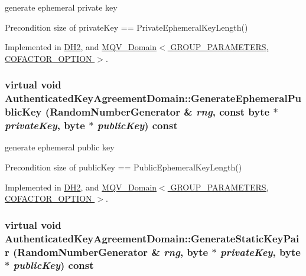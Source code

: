 generate ephemeral private key \begin{DoxyPrecond}{Precondition}
size of privateKey == PrivateEphemeralKeyLength() 
\end{DoxyPrecond}


Implemented in \hyperlink{class_d_h2_ab0e10e700f4461005b386a53ca37e7f8}{DH2}, and \hyperlink{class_m_q_v___domain_aefc317e9012eea4b7f43b3a72398e34d}{MQV\_\-Domain$<$ GROUP\_\-PARAMETERS, COFACTOR\_\-OPTION $>$}.\hypertarget{class_authenticated_key_agreement_domain_a9d1bc83a77f44af6616da42c33b3bc49}{
\subsubsection[{GenerateEphemeralPublicKey}]{\setlength{\rightskip}{0pt plus 5cm}virtual void AuthenticatedKeyAgreementDomain::GenerateEphemeralPublicKey ({\bf RandomNumberGenerator} \& {\em rng}, \/  const byte $\ast$ {\em privateKey}, \/  byte $\ast$ {\em publicKey}) const}}
\label{class_authenticated_key_agreement_domain_a9d1bc83a77f44af6616da42c33b3bc49}


generate ephemeral public key \begin{DoxyPrecond}{Precondition}
size of publicKey == PublicEphemeralKeyLength() 
\end{DoxyPrecond}


Implemented in \hyperlink{class_d_h2_ab8f69e52f50794ca51774f671cfa45da}{DH2}, and \hyperlink{class_m_q_v___domain_a2cc3ee07353b65ac5f353ef5cb7aad14}{MQV\_\-Domain$<$ GROUP\_\-PARAMETERS, COFACTOR\_\-OPTION $>$}.\hypertarget{class_authenticated_key_agreement_domain_a164d5f09c1af319f4bd4a4d45c4b9309}{
\subsubsection[{GenerateStaticKeyPair}]{\setlength{\rightskip}{0pt plus 5cm}virtual void AuthenticatedKeyAgreementDomain::GenerateStaticKeyPair ({\bf RandomNumberGenerator} \& {\em rng}, \/  byte $\ast$ {\em privateKey}, \/  byte $\ast$ {\em publicKey}) const}}
\label{class_authenticated_key_agreement_domain_a164d5f09c1af319f4bd4a4d45c4b9309}


